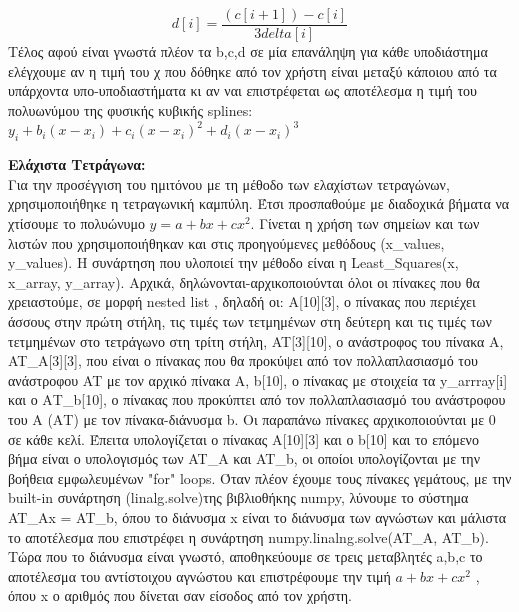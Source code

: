 \documentclass{article}
\begin{document}
\begin{equation*}
    d[i] = \dfrac{(c[i+1]) - c[i]}{3delta[i]}
\end{equation*}
Τέλος αφού είναι γνωστά πλέον τα b,c,d σε μία επανάληψη για κάθε υποδιάστημα ελέγχουμε αν η τιμή του χ που δόθηκε από τον χρήστη είναι μεταξύ κάποιου από τα υπάρχοντα υπο-υποδιαστήματα κι αν ναι επιστρέφεται ως αποτέλεσμα η τιμή του πολυωνύμου της φυσικής κυβικής splines: $y_i + b_i(x-x_i) + c_i(x - x_i)^2 + d_i(x-x_i)^3$
\par\textbf{Ελάχιστα Τετράγωνα:}\\
Για την προσέγγιση του ημιτόνου με τη μέθοδο των ελαχίστων τετραγώνων, χρησιμοποιήθηκε η τετραγωνική καμπύλη. Έτσι προσπαθούμε με διαδοχικά βήματα να χτίσουμε το πολυώνυμο $y = a + bx + cx^2$. Γίνεται η χρήση των σημείων και των λιστών που χρησιμοποιήθηκαν και στις προηγούμενες μεθόδους (x\_values, y\_values). Η συνάρτηση που υλοποιεί την μέθοδο είναι η Least\_Squares(x, x\_array, y\_array). Αρχικά, δηλώνονται-αρχικοποιούνται όλοι οι πίνακες που θα χρειαστούμε, σε μορφή nested list , δηλαδή οι:
A[10][3], ο πίνακας που περιέχει άσσους στην πρώτη στήλη, τις τιμές των τετμημένων στη δεύτερη και τις τιμές των τετμημένων στο τετράγωνο στη τρίτη στήλη, AT[3][10], ο ανάστροφος του πίνακα Α, AT\_A[3][3], που είναι ο πίνακας που θα προκύψει από τον πολλαπλασιασμό του ανάστροφου AT με τον αρχικό πίνακα Α, b[10], ο πίνακας με στοιχεία τα y\_arrray[i] και ο ΑΤ\_b[10], ο πίνακας που προκύπτει από τον πολλαπλασιασμό του ανάστροφου του Α (ΑΤ) με τον πίνακα-διάνυσμα b. Οι παραπάνω πίνακες αρχικοποιούνται με 0 σε κάθε κελί. Έπειτα υπολογίζεται ο πίνακας Α[10][3] και ο b[10] και το επόμενο βήμα είναι ο υπολογισμός των AT\_A και AT\_b, οι οποίοι υπολογίζονται με την βοήθεια εμφωλευμένων "for" loops. Όταν πλέον έχουμε τους πίνακες γεμάτους, με την built-in συνάρτηση (linalg.solve)της βιβλιοθήκης numpy, λύνουμε το σύστημα AT\_Ax = AT\_b, όπου το διάνυσμα x είναι το διάνυσμα των αγνώστων και μάλιστα το αποτέλεσμα που επιστρέφει η συνάρτηση numpy.linalng.solve(AT\_A, AT\_b). Τώρα που το διάνυσμα είναι γνωστό, αποθηκεύουμε σε τρεις μεταβλητές a,b,c το αποτέλεσμα του αντίστοιχου αγνώστου και επιστρέφουμε την τιμή $a + bx + cx^2$ , όπου x ο αριθμός που δίνεται σαν είσοδος από τον χρήστη.
\end{document}
